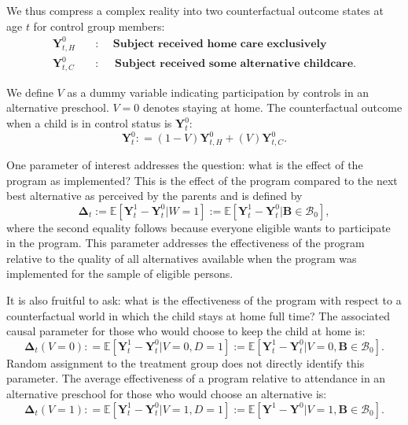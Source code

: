 We thus compress a complex reality into two counterfactual outcome states at age $t$ for control group members:
\begin{align*}
\bm{Y}_{t,H}^0 \quad &: \quad \textbf{ Subject received home care exclusively} \\
\bm{Y}_{t,C}^0 \quad &: \quad \textbf{ Subject received some alternative childcare}.
\end{align*}

We define $V$ as a dummy variable indicating participation by controls in an alternative preschool. $V=0$ denotes staying at home. The counterfactual outcome when a child is in control status is $\bm{Y}^0_t$:
\begin{equation}
\bm{Y}^0_t : = \left( 1 - V \right) \bm{Y}^0_{t,H} + \left( V \right) \bm{Y}^0_{t,C}.
\end{equation}

One parameter of interest addresses the question: what is the effect of the program as implemented? This is the effect of the program compared to the next best alternative as perceived by the parents and is defined by
\begin{equation}\label{eq:effect}
\bm{\Delta}_t := \mathbb{E} \left[ \bm{Y}^1_t -  \bm{Y}^0_t | W =1 \right] := \mathbb{E} \left[\bm{Y}^1_t - \bm{Y}^0_t | \bm{B} \in \mathcal{B}_0 \right],
\end{equation}
where the second equality follows because everyone eligible wants to participate in the program. This parameter addresses the effectiveness of the program relative to the quality of all alternatives available when the program was implemented for the sample of eligible persons.

It is also fruitful to ask: what is the effectiveness of the program with respect to a counterfactual world in which the child stays at home full time? The associated causal parameter for those who would choose to keep the child at home is:
\begin{equation}\label{eq:influenza}
\bm{\Delta}_t \left(V = 0 \right) : =   \mathbb{E} \left[ \bm{Y}^1_t - \bm{Y}^0_t | V = 0, D = 1 \right] := \mathbb{E} \left[\bm{Y}^1_t - \bm{Y}^0_t | V = 0, \bm{B} \in \mathcal{B}_0 \right].
\end{equation}
Random assignment to the treatment group does not directly identify this parameter. The average effectiveness of a program relative to attendance in an alternative preschool for those who would choose an alternative is:
\begin{equation}\label{eq:smallpox}
\bm{\Delta}_t \left( V =1 \right) : =   \mathbb{E} \left[ \bm{Y}^1_t - \bm{Y}^0_t | V = 1, D = 1 \right] := \mathbb{E} \left[\bm{Y}^1 - \bm{Y}^0 | V = 1, \bm{B} \in \mathcal{B}_0 \right].
\end{equation}


